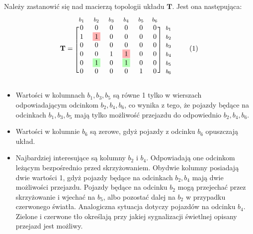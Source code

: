 \documentclass[12pt]{book}
\theoremstyle{plain}
\newcommand\addtag{\refstepcounter{equation}
\renewcommand{\labelenumii}{\theenumii}
\renewcommand{\theenumii}{\theenumi.\arabic{enumii}.}
\tag{\theequation}}
\begin{document}
Należy zastanowić się nad macierzą topologii układu $\textbf{T}$. Jest ona następująca:
\begin{equation*}
\textbf{T}=
\begin{blockarray}{*{6}{c} l}
\begin{block}{*{6}{>{$\footnotesize}c<{$}} l}
$b_1$ & $b_2$ & $b_3$ & $b_4$ & $b_5$ & $b_6$ \\
\end{block}
\begin{block}{[*{6}{c}]>{$\footnotesize}l<{$}}
0 & 0 & 0 & 0 & 0 & 0 & $b_1$ \\
1 & \colorbox{red!30}{1} & 0 & 0 & 0 & 0 & $b_2$ \\
0 & 0 & 0 & 0 & 0 & 0 & $b_3$ \\
0 & 0 & 1 & \colorbox{red!30}{1} & 0 & 0 & $b_4$ \\
0 & \colorbox{green!30}{1} & 0 & \colorbox{green!30}{1} & 0 & 0 & $b_5$ \\
0 & 0 & 0 & 0 & 1 & 0 & $b_6$ \\
\end{block}
\end{blockarray} \addtag
\end{equation*}
\begin{itemize}
	\item Wartości w kolumnach $b_1,b_3,b_5$ są równe 1 tylko w wierszach odpowiadającym odcinkom $b_2,b_4,b_6$, co wynika z tego, że pojazdy będące na odcinkach $b_1,b_3,b_5$ mają tylko możliwość przejazdu do odpowiednio $b_2,b_4,b_6$.
	\item Wartości w kolumnie $b_6$ są zerowe, gdyż pojazdy z odcinku $b_6$ opuszczają układ.
	\item Najbardziej interesujące są kolumny $b_2$ i $b_4$. Odpowiadają one odcinkom leżącym bezpośrednio przed skrzyżowaniem. Obydwie kolumny posiadają dwie wartości 1, gdyż pojazdy będące na odcinkach $b_2,b_4$ mają dwie możliwości przejazdu. Pojazdy będące na odcinku $b_2$ mogą przejechać przez skrzyżowanie i wjechać na $b_5$, albo pozostać dalej na $b_2$ w przypadku czerwonego światła. Analogiczna sytuacja dotyczy pojazdów na odcinku $b_4$. \colorbox{green!30}{Zielone} i \colorbox{red!30}{czerwone} tło określają przy jakiej sygnalizacji świetlnej opisany przejazd jest możliwy.
\end{itemize}
\end{document}
